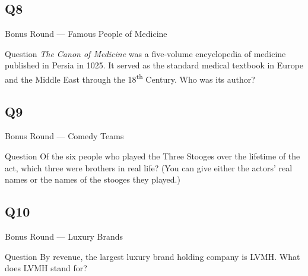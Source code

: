 \documentclass[11pt]{beamer}
\begin{document}
\subsection*{Q8}
\begin{frame}[t]{Bonus Round --- Famous People of Medicine}
\vspace{-0.5em}
\begin{block}{Question}
\emph{The Canon of Medicine} was a five-volume encyclopedia of medicine published in Persia in 1025. It served as the standard medical textbook in Europe and the Middle East through the 18\textsuperscript{th} Century. Who was its author?
\end{block}
\end{frame}
\subsection*{Q9}
\begin{frame}[t]{Bonus Round --- Comedy Teams}
\vspace{-0.5em}
\begin{block}{Question}
Of the six people who played the Three Stooges over the lifetime of the act, which three were brothers in real life? (You can give either the actors' real names or the names of the stooges they played.)
\end{block}
\end{frame}
\subsection*{Q10}
\begin{frame}[t]{Bonus Round --- Luxury Brands}
\vspace{-0.5em}
\begin{block}{Question}
By revenue, the largest luxury brand holding company is LVMH\@. What does LVMH stand for?
\end{block}
\end{frame}
\end{document}
